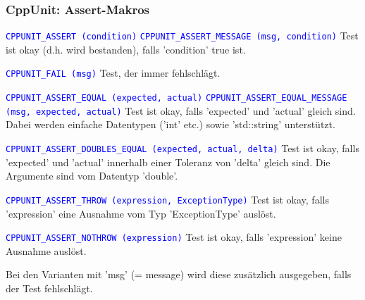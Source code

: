 \begin{multicols}{2}
\subsubsection{CppUnit: Assert-Makros}
\begin{minipage}{10cm}
\begin{itemize}
\footnotesize{
	\item \textcolor{blue}{\texttt{CPPUNIT\_ASSERT (condition)}}\newline 
	\textcolor{blue}{\texttt{CPPUNIT\_ASSERT\_MESSAGE (msg, condition)}} \newline 
	Test ist okay (d.h. wird bestanden), falls 'condition' true ist.
	\item \textcolor{blue}{\texttt{CPPUNIT\_FAIL (msg)}} \newline
	Test, der immer fehlschlägt.
	\item \textcolor{blue}{\texttt{CPPUNIT\_ASSERT\_EQUAL (expected, actual)}} \newline 
	\textcolor{blue}{\texttt{CPPUNIT\_ASSERT\_EQUAL\_MESSAGE (msg, expected, actual)}} \newline 
	Test ist okay, falls 'expected' und 'actual' gleich sind. Dabei werden \newline einfache Datentypen ('int' etc.) sowie 'std::string' unterstützt.
	\item \textcolor{blue}{\texttt{CPPUNIT\_ASSERT\_DOUBLES\_EQUAL (expected, actual, delta)}} \newline Test ist okay, falls 'expected' und 'actual' innerhalb einer Toleranz von \newline 'delta' gleich sind. Die Argumente sind vom Datentyp 'double'.
	\item \textcolor{blue}{\texttt{CPPUNIT\_ASSERT\_THROW (expression, ExceptionType)}} \newline Test ist okay, falls 'expression' eine Ausnahme vom Typ 'ExceptionType' auslöst.
	\item \textcolor{blue}{\texttt{CPPUNIT\_ASSERT\_NOTHROW (expression)}} \newline 
	Test ist okay, falls 'expression' keine Ausnahme auslöst.
	\item Bei den Varianten mit 'msg' (= message) wird diese zusätzlich \newline ausgegeben, falls der Test fehlschlägt.}
\end{itemize}
\end{minipage}

\end{multicols}
